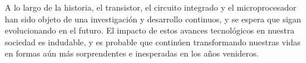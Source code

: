 \documentclass{article}
\begin{document}
A lo largo de la historia, el transistor, el circuito integrado y el microprocesador han sido objeto de una investigación 
y desarrollo continuos, y se espera que sigan evolucionando en el futuro. El impacto de estos avances tecnológicos 
en nuestra sociedad es indudable, y es probable que continúen transformando nuestras vidas 
en formas aún más sorprendentes e inesperadas en los años venideros.




\end{document}
